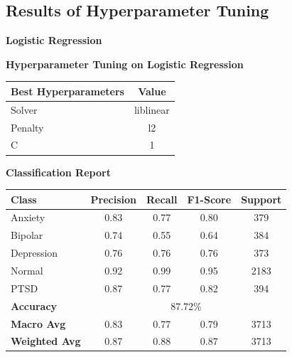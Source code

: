 
\pagebreak

\subsection{Results of Hyperparameter Tuning}

\noindent
\textbf{Logistic Regression}
\begin{center}
    \textbf{Hyperparameter Tuning on Logistic Regression} \\[0.5em]
    \begin{tabular}{|l|c|}
        \hline
        \textbf{Best Hyperparameters}  & \textbf{Value} \\ \hline
        Solver                        & liblinear      \\ \hline
        Penalty                       & l2             \\ \hline
        C                              & 1              \\ \hline
    \end{tabular}
\end{center}

\begin{center}
    \textbf{Classification Report} \\[0.5em]
    \begin{tabular}{|l|c|c|c|c|}
        \hline
        \textbf{Class} & \textbf{Precision} & \textbf{Recall} & \textbf{F1-Score} & \textbf{Support} \\ \hline
        Anxiety        & 0.83               & 0.77            & 0.80              & 379             \\ \hline
        Bipolar        & 0.74               & 0.55            & 0.64              & 384             \\ \hline
        Depression     & 0.76               & 0.76            & 0.76              & 373             \\ \hline
        Normal         & 0.92               & 0.99            & 0.95              & 2183            \\ \hline
        PTSD           & 0.87               & 0.77            & 0.82              & 394             \\ \hline
        \textbf{Accuracy} & \multicolumn{4}{|c|}{87.72\%} \\ \hline
        \textbf{Macro Avg} & 0.83            & 0.77            & 0.79              & 3713            \\ \hline
        \textbf{Weighted Avg} & 0.87         & 0.88            & 0.87              & 3713            \\ \hline
    \end{tabular}
\end{center}


